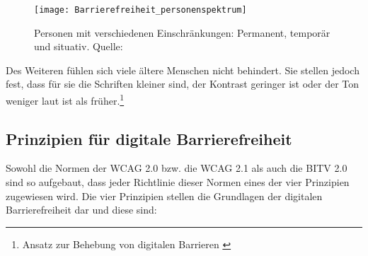 \begin{figure}[H]
	\centering
	\texttt{[image: Barrierefreiheit\_personenspektrum]}
	\caption[Personen mit verschiedenen Einschränkungen: Permanent, temporär und situativ]{Personen mit verschiedenen Einschränkungen: Permanent, temporär und situativ. 
	 Quelle: \cite{mach}}
	\label{fig:Beispielhafte Einschränkungen}
\end{figure}

Des Weiteren fühlen sich viele ältere Menschen nicht behindert. Sie stellen jedoch fest, dass für sie die Schriften kleiner sind, der Kontrast geringer ist oder der Ton weniger laut ist als früher.\footnote{Ansatz zur Behebung von digitalen Barrieren \cite{giorgashvili2020nutzerzentrierter}}

\subsection{Prinzipien für digitale Barrierefreiheit}
\label{subsec:Prinzipien fuer Barrierefreiheit}

Sowohl die Normen der \ac{WCAG} 2.0 bzw. die \ac{WCAG} 2.1 als auch die \ac{BITV} 2.0 sind so aufgebaut, dass jeder Richtlinie dieser Normen eines der vier Prinzipien zugewiesen wird. Die vier Prinzipien stellen die Grundlagen der digitalen Barrierefreiheit dar und diese sind:

